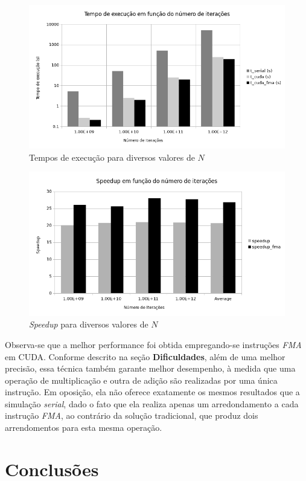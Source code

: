 \documentclass[12pt]{article}
\begin{document}
\begin{figure}
  \centering
  \includegraphics[width=0.8\linewidth]{img/time}
  \caption{Tempos de execução para diversos valores de \(N\)}
  \label{fig:time}
\end{figure}

\begin{figure}
  \centering
  \includegraphics[width=0.8\linewidth]{img/speedup}
  \caption{\textit{Speedup} para diversos valores de \(N\)}
  \label{fig:speedup}
\end{figure}

Observa-se que a melhor performance foi obtida empregando-se instruções
\textit{FMA} em CUDA. Conforme descrito na seção \textbf{Dificuldades}, além de
uma melhor precisão, essa técnica também garante melhor desempenho, à medida que
uma operação de multiplicação e outra de adição são realizadas por uma única
instrução. Em oposição, ela não oferece exatamente os mesmos resultados que a
simulação \textit{serial}, dado o fato que ela realiza apenas um arredondamento
a cada instrução \textit{FMA}, ao contrário da solução tradicional, que produz
dois arrendomentos para esta mesma operação.

\section{Conclusões}
\end{document}
